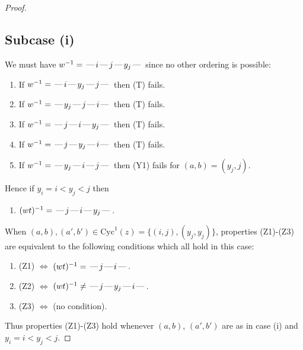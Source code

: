 \documentclass[10pt]{article}
\theoremstyle{definition}
\theoremstyle{definition}
\def\dash{\text{\hspace{0.5mm}---\hspace{0.5mm}}}
\def\Cyc{\mathrm{Cyc}}
\begin{document}
\begin{proof}
\subsection{Subcase (i)}
We must have $w^{-1} = \dash i\dash j\dash y_j\dash $
since no other ordering is possible:
\begin{enumerate}
\item If $w^{-1} = \dash i\dash y_j\dash j\dash $ then (T) fails.
\item If $w^{-1} = \dash y_j\dash j\dash i\dash $ then (T) fails.
\item If $w^{-1} = \dash j\dash i\dash y_j\dash $ then (T) fails.
\item If $w^{-1} = \dash j\dash y_j\dash i\dash $ then (T) fails.
\item If $w^{-1} = \dash y_j\dash i\dash j\dash $ then (Y1) fails for $(a,b)=(y_j,j)$.
\end{enumerate}
Hence if $y_i = i < y_j < j$ then \begin{enumerate}\item[] $(wt)^{-1} = \dash j\dash i\dash y_j\dash $. \end{enumerate}
When $(a,b),(a',b')\in\Cyc^1(z)= \{(i,j),(y_j,y_j)\}$,
properties (Z1)-(Z3) are equivalent to the following conditions which all hold in this case:
\begin{enumerate}
\item[](Z1) $\Leftrightarrow$ $(wt)^{-1} = \dash j \dash i \dash$.
\item[](Z2) $\Leftrightarrow$ $(wt)^{-1} \neq \dash j \dash y_j \dash i \dash$.
\item[](Z3) $\Leftrightarrow$ (no condition).
\end{enumerate}
Thus properties (Z1)-(Z3) hold whenever $(a,b)$, $(a',b')$ are as in case (i) and $y_i = i < y_j < j$.

\end{proof}
\end{document}
